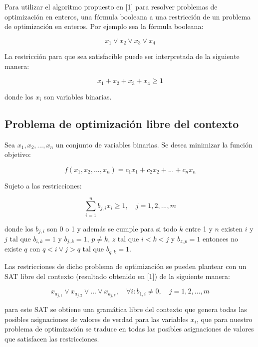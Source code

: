 \documentclass{article}
\begin{document}
Para utilizar el algoritmo propuesto en [1] para resolver problemas de optimización en enteros, una fórmula booleana a una restricción de un problema
de optimización en enteros. Por ejemplo sea la fórmula booleana:

\begin{equation}
    x_1 \lor x_2  \lor x_3 \lor x_4
\end{equation}

La restricción para que sea satisfacible puede ser interpretada de la siguiente manera:

\begin{equation}
    x_1 + x_2 + x_3 + x_4 \geq 1
\end{equation}

donde los $x_i$ son variables binarias.

\subsection*{Problema de optimización libre del contexto}

Sea $x_1, x_2, ..., x_n$ un conjunto de variables binarias. Se desea minimizar la función objetivo:

\begin{equation}
    f(x_1, x_2, ..., x_n) = c_1x_1 + c_2x_2 + ... + c_nx_n
\end{equation}

Sujeto a las restricciones:

\begin{equation}
    \sum_{i = 1}^{n} b_{j,i}x_i \geq 1, \quad j = 1, 2, ..., m
\end{equation}

donde los $b_{j,i}$ son 0 o 1 y además se cumple para si todo $k$ entre 1 y $n$ existen $i$ y $j$ tal que $b_{i,k} = 1$ y $b_{j,k} = 1$, $p\neq k$, 
$z$ tal que $i<k<j$ y $b_{z,p} = 1$ entonces no existe $q$ con $q<i \lor j>q$ tal que $b_{q,k}=1$.

Las restricciones de dicho problema de optimización se pueden plantear con un SAT libre del contexto (resultado obtenido en [1]) de la siguiente
manera:

\begin{equation}
    x_{a_{j,1}} \lor x_{a_{j,2}} \lor ... \lor x_{a_{j,k}}, \quad \forall i : b_{1,i} \neq 0, \quad j = 1, 2, ..., m
\end{equation} 

para este SAT se obtiene una gramática libre del contexto que genera todas las posibles asignaciones de valores de verdad para las variables $x_i$,
que para nuestro problema de optimización se traduce en todas las posibles asignaciones de valores que satisfacen las restricciones.
\end{document}
